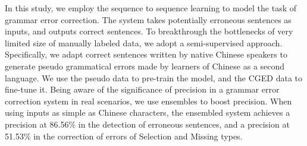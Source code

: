 In this study, we employ the sequence to sequence learning to model the task of grammar error correction. The system takes potentially erroneous sentences as inputs, and outputs correct sentences. To breakthrough the bottlenecks of very limited size of manually labeled data, we adopt a semi-supervised approach. Specifically, we adapt correct sentences written by native Chinese speakers to generate pseudo grammatical errors made by learners of Chinese as a second language. We use the pseudo data to pre-train the model, and the CGED data to fine-tune it. Being aware of the significance of precision in a grammar error correction system in real scenarios, we use ensembles to boost precision. When using inputs as simple as Chinese characters, the ensembled system achieves a precision at 86.56\% in the detection of erroneous sentences, and a precision at 51.53\% in the correction of errors of Selection and Missing types.
